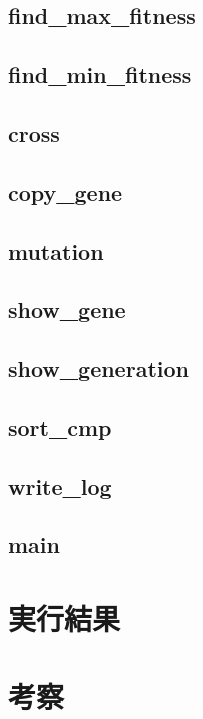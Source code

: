\documentclass{jsarticle}
\begin{document}
\subsection{find\_max\_fitness}
\subsection{find\_min\_fitness}
\subsection{cross}
\subsection{copy\_gene}
\subsection{mutation}
\subsection{show\_gene}
\subsection{show\_generation}
\subsection{sort\_cmp}
\subsection{write\_log}
\subsection{main}
\section{実行結果}
\section{考察}
\end{document}
